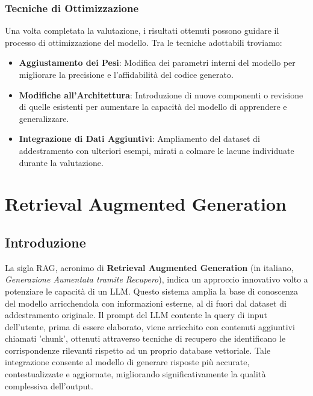 \documentclass[12pt,a4paper,openright,twoside]{book}
\begin{document}
\subsection{Tecniche di Ottimizzazione}
Una volta completata la valutazione, i risultati ottenuti possono guidare il processo di ottimizzazione del modello. Tra le tecniche adottabili troviamo:
\begin{itemize}
    \item \textbf{Aggiustamento dei Pesi}: Modifica dei parametri interni del modello per migliorare la precisione e l'affidabilità del codice generato.
    \item \textbf{Modifiche all'Architettura}: Introduzione di nuove componenti o revisione di quelle esistenti per aumentare la capacità del modello di apprendere e generalizzare.
    \item \textbf{Integrazione di Dati Aggiuntivi}: Ampliamento del dataset di addestramento con ulteriori esempi, mirati a colmare le lacune individuate durante la valutazione.
\end{itemize}
\chapter{Retrieval Augmented Generation}
\section{Introduzione} 
La sigla RAG, acronimo di \textbf{Retrieval Augmented Generation} (in italiano, \textit{Generazione Aumentata tramite Recupero}), indica un approccio innovativo volto a potenziare le capacità di un \ac{LLM}.
Questo sistema amplia la base di conoscenza del modello arricchendola con informazioni esterne, al di fuori dal dataset di addestramento originale.
Il prompt del \ac{LLM} contente la query di input dell'utente, prima di essere elaborato, viene arricchito con contenuti aggiuntivi chiamati 'chunk', ottenuti attraverso tecniche di recupero che identificano le corrispondenze rilevanti rispetto ad un proprio database vettoriale.
Tale integrazione consente al modello di generare risposte più accurate, contestualizzate e aggiornate, migliorando significativamente la qualità complessiva dell’output.
\end{document}
